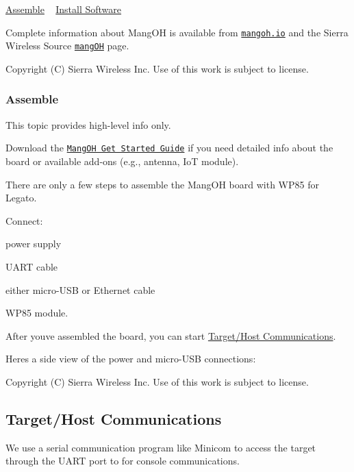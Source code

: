 \hyperlink{getstartedMangOHAssemble}{Assemble} ~\newline
 \hyperlink{getstartedMangOHInstallSoftware}{Install Software}

Complete information about Mang\+O\+H is available from \href{https://mangoh.io/}{\tt mangoh.\+io} and the Sierra Wireless Source \href{http://source.sierrawireless.com/mangoh/}{\tt mang\+O\+H} page.





Copyright (C) Sierra Wireless Inc. Use of this work is subject to license. \hypertarget{getstartedMangOHAssemble}{}\subsubsection{Assemble}\label{getstartedMangOHAssemble}
This topic provides high-\/level info only.

Download the \href{http://source.sierrawireless.com/mangoh/}{\tt Mang\+O\+H Get Started Guide} if you need detailed info about the board or available add-\/ons (e.\+g., antenna, Io\+T module).



 There are only a few steps to assemble the Mang\+O\+H board with W\+P85 for Legato.

Connect\+:
\begin{DoxyItemize}
\item power supply
\item U\+A\+R\+T cable
\item either micro-\/\+U\+S\+B or Ethernet cable
\item W\+P85 module.
\end{DoxyItemize}

After you\textquotesingle{}ve assembled the board, you can start \hyperlink{getstartedTargetHostCom}{Target/\+Host Communications}.



Here\textquotesingle{}s a side view of the power and micro-\/\+U\+S\+B connections\+:







Copyright (C) Sierra Wireless Inc. Use of this work is subject to license. \hypertarget{getstartedTargetHostCom}{}\subsection{Target/\+Host Communications}\label{getstartedTargetHostCom}
We use a serial communication program like Minicom to access the target through the U\+A\+R\+T port to for console communications.

